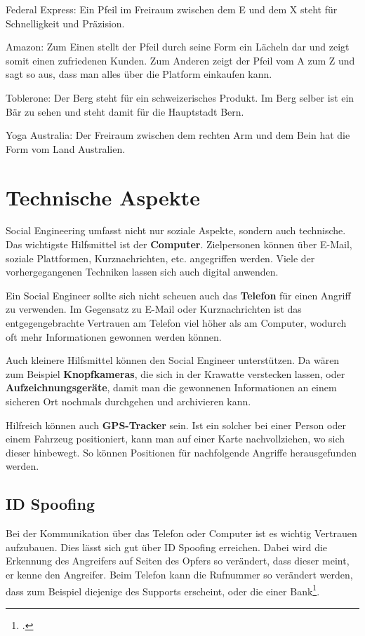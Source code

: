 Federal Express: Ein Pfeil im Freiraum zwischen dem E und dem X steht für Schnelligkeit und Präzision.

Amazon: Zum Einen stellt der Pfeil durch seine Form ein Lächeln dar und zeigt somit einen zufriedenen Kunden. Zum Anderen zeigt der Pfeil vom A zum Z und sagt so aus, dass man alles über die Platform einkaufen kann.

Toblerone: Der Berg steht für ein schweizerisches Produkt. Im Berg selber ist ein Bär zu sehen und steht damit für die Hauptstadt Bern.

Yoga Australia: Der Freiraum zwischen dem rechten Arm und dem Bein hat die Form vom Land Australien.

\section{Technische Aspekte}
Social Engineering umfasst nicht nur soziale Aspekte, sondern auch technische. Das wichtigste Hilfsmittel ist der \textbf{Computer}. Zielpersonen können über E-Mail, soziale Plattformen, Kurznachrichten, etc. angegriffen werden. Viele der vorhergegangenen Techniken lassen sich auch digital anwenden. 

Ein Social Engineer sollte sich nicht scheuen auch das \textbf{Telefon} für einen Angriff zu verwenden. Im Gegensatz zu E-Mail oder Kurznachrichten ist das entgegengebrachte Vertrauen am Telefon viel höher als am Computer, wodurch oft mehr Informationen gewonnen werden können.

Auch kleinere Hilfsmittel können den Social Engineer unterstützen. Da wären zum Beispiel \textbf{Knopfkameras}, die sich in der Krawatte verstecken lassen, oder \textbf{Aufzeichnungsgeräte}, damit man die gewonnenen Informationen an einem sicheren Ort nochmals durchgehen und archivieren kann.

Hilfreich können auch \textbf{GPS-Tracker} sein. Ist ein solcher bei einer Person oder einem Fahrzeug positioniert, kann man auf einer Karte nachvollziehen, wo sich dieser hinbewegt. So können Positionen für nachfolgende Angriffe herausgefunden werden.

\subsection{ID Spoofing}
\label{sec:socialengineering:technischeaspekte:idspoofing}
Bei der Kommunikation über das Telefon oder Computer ist es wichtig Vertrauen aufzubauen. Dies lässt sich gut über ID Spoofing erreichen. Dabei wird die Erkennung des Angreifers auf Seiten des Opfers so verändert, dass dieser meint, er kenne den Angreifer. Beim Telefon kann die Rufnummer so verändert werden, dass zum Beispiel diejenige des Supports erscheint, oder die einer Bank\footcite{human_hacking}.

